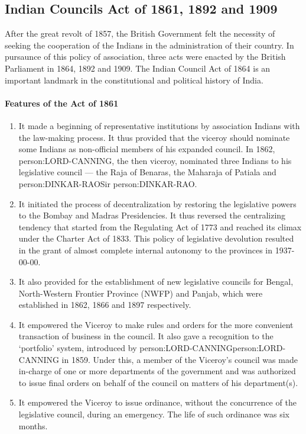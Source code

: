 \subsection{Indian Councils Act of 1861, 1892 and 1909}

After the great revolt of 1857, the British Government felt the necessity of seeking the cooperation of the Indians in the administration of their country. In pursaunce of this policy of association, three acts were enacted by the British Parliament in 1864, 1892 and 1909. The Indian Council Act of 1864 is an important landmark in the constitutional and political history of India.

\paragraph{Features of the Act of 1861}
\begin{enumerate}
  \item It made a beginning of representative institutions by association Indians with the law-making process. It thus provided that the viceroy should nominate some Indians as non-official members of his expanded council. In 1862, \gls{person:LORD-CANNING}, the then viceroy, nominated three Indians to his legislative council — the Raja of Benaras, the Maharaja of Patiala and \gls{person:DINKAR-RAO}Sir \gls{person:DINKAR-RAO}.
  \item It initiated the process of decentralization by restoring the legislative powers to the Bombay and Madras Presidencies. It thus reversed the centralizing tendency that started from the Regulating Act of 1773 and reached its climax under the Charter Act of 1833. This policy of legislative devolution resulted in the grant of almost complete internal autonomy to the provinces in 1937-00-00.
  \item It also provided for the establishment of new legislative councils for Bengal, North-Western Frontier Province (NWFP) and Panjab, which were established in 1862, 1866 and 1897 respectively.
  \item It empowered the Viceroy to make rules and orders for the more convenient transaction of business in the council. It also gave a recognition to the  `portfolio' system, introduced by \gls{person:LORD-CANNING}\gls{person:LORD-CANNING} in 1859. Under this, a member of the Viceroy's council was made in-charge of one or more departments of the government and was authorized to issue final orders on behalf of the council on matters of his department(s).
  \item It empowered the Viceroy to issue ordinance, without the concurrence of the legislative council, during an emergency. The life of such ordinance was six months.
\end{enumerate}

